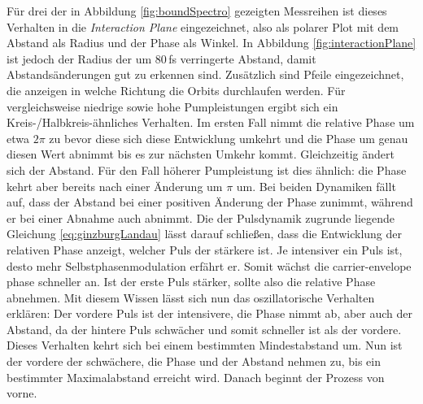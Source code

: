 \documentclass[bachelor,       %
               twoside,        %
               BCOR10mm,       %
               english,ngerman, %
               ]{GAUBM}
\begin{document}
 
Für drei der in Abbildung \ref{fig:boundSpectro} gezeigten Messreihen ist dieses Verhalten in die \textit{Interaction Plane} eingezeichnet, also als polarer Plot mit dem Abstand als Radius und der Phase als Winkel.
In Abbildung \ref{fig:interactionPlane} ist jedoch der Radius der um 80\,fs verringerte Abstand, damit Abstandsänderungen gut zu erkennen sind.
Zusätzlich sind Pfeile eingezeichnet, die anzeigen in welche Richtung die Orbits durchlaufen werden.
Für vergleichsweise niedrige sowie hohe Pumpleistungen ergibt sich ein Kreis-/Halbkreis-ähnliches Verhalten.
Im ersten Fall nimmt die relative Phase um etwa $2\pi$ zu bevor diese sich diese Entwicklung umkehrt und die Phase um genau diesen Wert abnimmt bis es zur nächsten Umkehr kommt.
Gleichzeitig ändert sich der Abstand.
Für den Fall höherer Pumpleistung ist dies ähnlich: die Phase kehrt aber bereits nach einer Änderung um $\pi$ um.
Bei beiden Dynamiken fällt auf, dass der Abstand bei einer positiven Änderung der Phase zunimmt, während er bei einer Abnahme auch abnimmt.
Die der Pulsdynamik zugrunde liegende Gleichung \eqref{eq:ginzburgLandau} lässt darauf schließen, dass die Entwicklung der relativen Phase anzeigt, welcher Puls der stärkere ist.
Je intensiver ein Puls ist, desto mehr Selbstphasenmodulation erfährt er.
Somit wächst die carrier-envelope phase schneller an.
Ist der erste Puls stärker, sollte also die relative Phase abnehmen.
Mit diesem Wissen lässt sich nun das oszillatorische Verhalten erklären:
Der vordere Puls ist der intensivere, die Phase nimmt ab, aber auch der Abstand, da der hintere Puls schwächer und somit schneller ist als der vordere.
Dieses Verhalten kehrt sich bei einem bestimmten Mindestabstand um.
Nun ist der vordere der schwächere, die Phase und der Abstand nehmen zu, bis ein bestimmter Maximalabstand erreicht wird.
Danach beginnt der Prozess von vorne.
\end{document}
